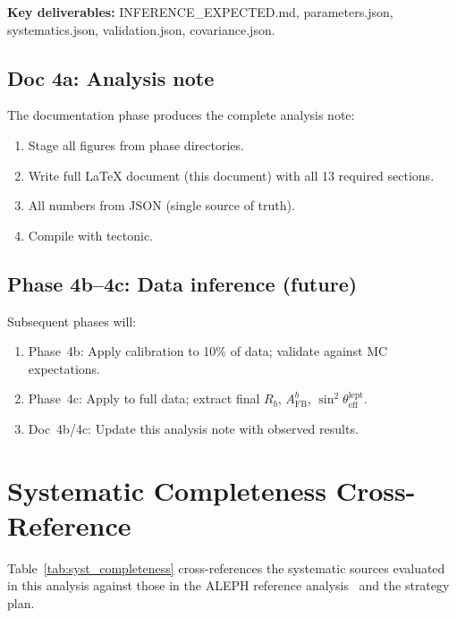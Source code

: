 \documentclass[11pt,a4paper]{article}
\begin{document}
\textbf{Key deliverables:} INFERENCE\_EXPECTED.md, parameters.json, systematics.json,
validation.json, covariance.json.

\subsection{Doc 4a: Analysis note}

The documentation phase produces the complete analysis note:
\begin{enumerate}
\item Stage all figures from phase directories.
\item Write full LaTeX document (this document) with all 13 required sections.
\item All numbers from JSON (single source of truth).
\item Compile with tectonic.
\end{enumerate}

\subsection{Phase 4b--4c: Data inference (future)}

Subsequent phases will:
\begin{enumerate}
\item Phase~4b: Apply calibration to 10\% of data; validate against MC expectations.
\item Phase~4c: Apply to full data; extract final $R_b$, $A_\mathrm{FB}^b$,
$\sin^2\theta_\mathrm{eff}^\mathrm{lept}$.
\item Doc~4b/4c: Update this analysis note with observed results.
\end{enumerate}

\section{Systematic Completeness Cross-Reference}
\label{app:syst_completeness}

Table~\ref{tab:syst_completeness} cross-references the systematic sources evaluated
in this analysis against those in the ALEPH reference analysis~\cite{ALEPH:Rb:1996}
and the strategy plan.
\end{document}
